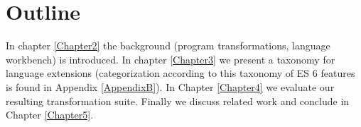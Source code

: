 \section{Outline}
In chapter \ref{Chapter2} the background (program transformations, language workbench) is introduced. In chapter \ref{Chapter3} we present a taxonomy for language extensions (categorization according to this taxonomy of ES 6 features is found in Appendix \ref{AppendixB}). In Chapter \ref{Chapter4} we evaluate our resulting transformation suite. Finally we discuss related work and conclude in Chapter \ref{Chapter5}.
